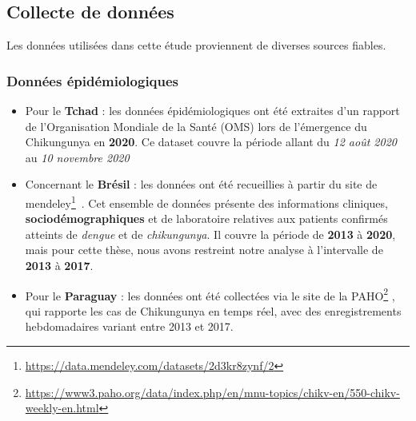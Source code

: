 \subsection{Collecte de données}
Les données utilisées dans cette étude proviennent de diverses sources fiables. 
\subsubsection{Données épidémiologiques}
\begin{itemize}
	\item Pour le \textbf{Tchad} : les données épidémiologiques ont été extraites d'un rapport~\cite{rapport2020oms} de l'Organisation Mondiale de la Santé (OMS) lors de l'émergence du Chikungunya en \textbf{2020}. Ce dataset couvre la période allant du \textit{12 août 2020} au \textit{10 novembre 2020}
	\item Concernant le \textbf{Brésil} : les données ont été recueillies à partir du site de mendeley\footnote{\url{https://data.mendeley.com/datasets/2d3kr8zynf/2}}~\cite{Oliveira2021}. Cet ensemble de données présente des informations cliniques, \textbf{sociodémographiques} et de laboratoire relatives aux patients confirmés atteints de \textit{dengue} et de \textit{chikungunya}. Il couvre la période de \textbf{2013} à \textbf{2020}, mais pour cette thèse, nous avons restreint notre analyse à l'intervalle de \textbf{2013} à \textbf{2017}.
	\item Pour le \textbf{Paraguay} : les données ont été collectées via le site de la PAHO\footnote{\url{https://www3.paho.org/data/index.php/en/mnu-topics/chikv-en/550-chikv-weekly-en.html}} , qui rapporte les cas de Chikungunya en temps réel, avec des enregistrements hebdomadaires variant entre 2013 et 2017.
\end{itemize}

